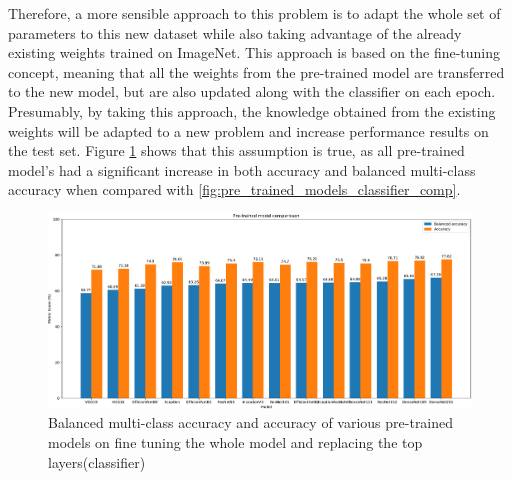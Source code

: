    Therefore, a more sensible approach to this problem is to adapt the whole set of parameters to this new dataset while also taking advantage of the already existing weights trained on ImageNet. This approach is based on the fine-tuning concept, meaning that all the weights from the pre-trained model are transferred to the new model, but are also updated along with the classifier on each epoch. Presumably, by taking this approach, the knowledge obtained from the existing weights will be adapted to a new problem and increase performance results on the test set. Figure \ref{fig:pre_trained_model_val_comp} shows that this assumption is true, as all pre-trained model's had a significant increase in both accuracy and balanced multi-class accuracy when compared with \ref{fig:pre_trained_models_classifier_comp}.  \par
    \begin{figure}[ht]
        \centering
        \includegraphics[scale=1.5, width=\textwidth]{figs/pre_trained_models_val_comp.pdf}
        \caption{Balanced multi-class accuracy and accuracy of various pre-trained models on fine tuning the whole model and replacing the top layers(classifier)}
        \label{fig:pre_trained_model_val_comp}
    \end{figure}
    
